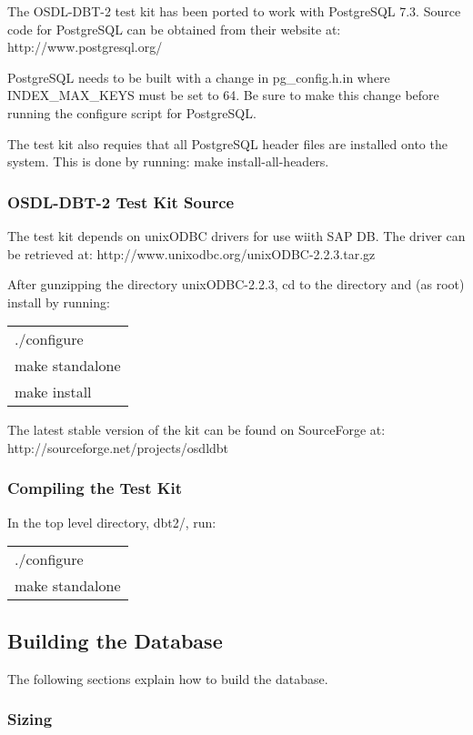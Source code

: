 \documentclass{article}
\begin{document}
The OSDL-DBT-2 test kit has been ported to work with PostgreSQL 7.3.  Source
code for PostgreSQL can be obtained from their website at:
http://www.postgresql.org/

PostgreSQL needs to be built with a change in pg_config.h.in where
INDEX_MAX_KEYS must be set to 64.  Be sure to make this change before running
the configure script for PostgreSQL.

The test kit also requies that all PostgreSQL header files are installed onto
the system.  This is done by running: make install-all-headers.

\subsubsection{OSDL-DBT-2 Test Kit Source}

The test kit depends on unixODBC drivers for use wiith SAP DB.  The driver
can be retrieved at: http://www.unixodbc.org/unixODBC-2.2.3.tar.gz

After gunzipping the directory unixODBC-2.2.3, cd to the directory and (as
root) install by running: \\
\begin{tabular}[c]{l}
./configure \\
make standalone \\
make install \\
\end{tabular}

The latest stable version of the kit can be found on SourceForge at:
http://sourceforge.net/projects/osdldbt

\subsubsection{Compiling the Test Kit}

In the top level directory, dbt2/, run: \\
\begin{tabular}[c]{l}
./configure \\
make standalone \\
\end{tabular}

\subsection{Building the Database}

The following sections explain how to build the database.

\subsubsection{Sizing}
\end{document}
